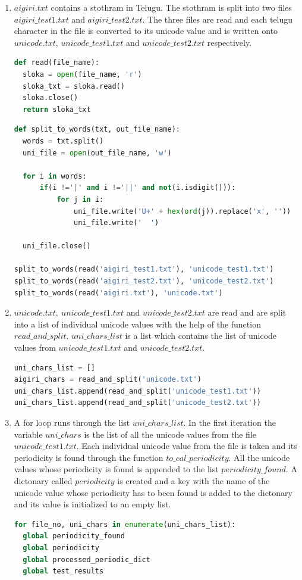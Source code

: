 \renewcommand{\theequation}{\theenumi}
\begin{enumerate}[label=\thesection.\arabic*.,ref=\thesection.\theenumi]

\item $aigiri.txt$ contains a stothram in Telugu. The stothram is split into two files $aigiri\_test1.txt$ and $aigiri\_test2.txt$. The three files are read and each telugu character in the file is converted to its unicode value and is written onto $unicode.txt$, $unicode\_test1.txt$ and $unicode\_test2.txt$ respectively.
\begin{lstlisting}[language=Python]
def read(file_name):
  sloka = open(file_name, 'r')
  sloka_txt = sloka.read()
  sloka.close()
  return sloka_txt
\end{lstlisting}

\begin{lstlisting}[language=Python]
def split_to_words(txt, out_file_name):
  words = txt.split()
  uni_file = open(out_file_name, 'w')

  for i in words:
      if(i !='|' and i !='||' and not(i.isdigit())):
          for j in i:
              uni_file.write('U+' + hex(ord(j)).replace('x', ''))
              uni_file.write('  ')

  uni_file.close()
  
split_to_words(read('aigiri_test1.txt'), 'unicode_test1.txt')
split_to_words(read('aigiri_test2.txt'), 'unicode_test2.txt')
split_to_words(read('aigiri.txt'), 'unicode.txt')
\end{lstlisting}

\item $unicode.txt,\  unicode\_test1.txt$ and $unicode\_test2.txt$ are read and are split into a list of individual unicode values with the help of the function $read\_and\_split$. $uni\_chars\_list$ is a list which contains the list of unicode values from $unicode\_test1.txt$ and $unicode\_test2.txt$.
\begin{lstlisting}[language=Python]
uni_chars_list = []
aigiri_chars = read_and_split('unicode.txt')
uni_chars_list.append(read_and_split('unicode_test1.txt'))
uni_chars_list.append(read_and_split('unicode_test2.txt'))
\end{lstlisting}

\item A for loop runs through the list $uni\_chars\_list$. In the first iteration the variable $uni\_chars$ is the list of all the unicode values from the file $unicode\_test1.txt$. Each individual unicode value from the file is taken and its periodicity is found through the function $to\_cal\_periodicity$.
All the unicode values whose periodicity is found is appended to the list $periodicity\_found$. A dictonary called $periodicity$ is created and a key with the name of the unicode value whose periodicity has to been found is added to the dictonary and its value is initialized to an empty list.  
\begin{lstlisting}[language=Python]
for file_no, uni_chars in enumerate(uni_chars_list):
  global periodicity_found 
  global periodicity 
  global processed_periodic_dict 
  global test_results


\end{lstlisting}
\end{enumerate}
